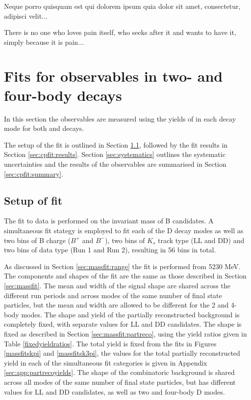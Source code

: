 \clearpage
\begin{savequote}[8cm]
\textlatin{Neque porro quisquam est qui dolorem ipsum quia dolor sit amet, consectetur, adipisci velit...}

There is no one who loves pain itself, who seeks after it and wants to have it, simply because it is pain...
\end{savequote}

\chapter{\label{ch:5-cpfit}Fits for \CP observables in two- and four-body decays} 

\minitoc

In this section the \CP observables are measured using the yields of \btodkst in each \D decay mode for both \Bp and \Bm decays.

The setup of the \CP fit is outlined in Section \ref{sec:cpfit:setup}, followed by the fit results in Section \ref{sec:cpfit:results}. Section \ref{sec:systematics} outlines the systematic uncertainties and the results of the \CP observables are summarised in Section \ref{sec:cpfit:summary}.

\section{Setup of \CP fit}
\label{sec:cpfit:setup}

The fit to data is performed on the invariant mass of B candidates. A simultaneous fit stategy is employed to fit each of the D decay modes as well as two bins of B charge ($B^+$ and $B^-$), two bins of $K_s$ track type (LL and DD) and two bins of data type (Run 1 and Run 2), resulting in 56 bins in total.

As discussed in Section \ref{sec:massfit:range} the \CP fit is performed from 5230 MeV. The components and shapes of the \CP fit are the same as those described in Section \ref{sec:massfit}. The mean and width of the signal shape are shared across the different run periods and across modes of the same number of final state particles, but the mean and width are allowed to be different for the 2 and 4-body modes. The shape and yield of the partially reconstructed background is completely fixed, with separate values for LL and DD candidates. The shape is fixed as described in Section \ref{sec:massfit:partreco}, using the yield ratios given in Table \ref{fixedyieldratios}. The total yield is fixed from the fits in Figures \ref{massfitskpi} and \ref{massfitsk3pi}, the values for the total partially reconstructed yield in each of the simultaneous fit categories is given in Appendix \ref{sec:app:partrecoyields}. The shape of the combinatoric background is shared across all modes of the same number of final state particles, but has different values for LL and DD candidates, as well as two and four-body D modes.


